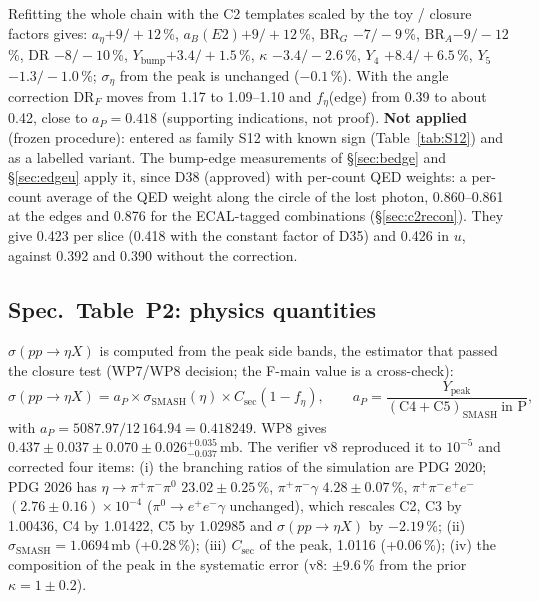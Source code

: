 \documentclass[11pt,a4paper]{article}
\newcommand{\piz}{\ensuremath{\pi^{0}}\xspace}
\newcommand{\ee}{\ensuremath{e^{+}e^{-}}\xspace}
\newcommand{\pipi}{\ensuremath{\pi^{+}\pi^{-}}\xspace}
\newcommand{\ppee}{\ensuremath{\pi^{+}\pi^{-}e^{+}e^{-}}\xspace}
\newcommand{\aEta}{\ensuremath{a_\eta}\xspace}
\newcommand{\aP}{\ensuremath{a_P}\xspace}
\newcommand{\aB}{\ensuremath{a_B(E2)}\xspace}%
\newcommand{\Ybump}{\ensuremath{Y_{\mathrm{bump}}}\xspace}
\newcommand{\Csec}{\ensuremath{C_{\mathrm{sec}}}\xspace}
\newcommand{\BRG}{\ensuremath{\mathrm{BR}_G}\xspace}
\newcommand{\BRA}{\ensuremath{\mathrm{BR}_A}\xspace}
\newcommand{\sigeta}{\ensuremath{\sigma(pp\to\eta X)}\xspace}
\newcommand{\tabin}[1]{}
\begin{document}
Refitting the whole chain with the C2 templates scaled by the toy / closure factors gives: \aEta $+9/+12$\,\%, \aB $+9/+12$\,\%, \BRG
$-7/-9$\,\%, \BRA $-9/-12$\,\%, DR $-8/-10$\,\%, \Ybump $+3.4/+1.5$\,\%, $\kappa$ $-3.4/-2.6$\,\%, $Y_4$ $+8.4/+6.5$\,\%, $Y_5$ $-1.3/-1.0$\,\%;
$\sigma_\eta$ from the peak is unchanged ($-0.1$\,\%). With the angle correction DR$_F$ moves from 1.17 to 1.09--1.10 and $f_\eta$(edge) from 0.39
to about 0.42, close to \aP $=0.418$ (supporting indications, not proof). \textbf{Not applied} (frozen procedure): entered as family S12 with
known sign (Table~\ref{tab:S12}) and as a labelled variant. The bump-edge measurements of \S\ref{sec:bedge} and \S\ref{sec:edgeu} apply it, since D38 (approved) with
per-count QED weights: a per-count average of the QED weight along the circle of the lost photon, 0.860--0.861 at the edges and 0.876 for the
ECAL-tagged combinations (\S\ref{sec:c2recon}). They give 0.423 per slice (0.418 with the constant factor of D35) and 0.426 in $u$, against
0.392 and 0.390 without the correction.

\tabin{wp8_eps2.tex}

\subsection{Spec.\ Table~P2: physics quantities}
\label{sec:p2}
\textbf{\sigeta} is computed from the peak side bands, the estimator that passed the closure test (WP7/WP8 decision; the F-main value is a
cross-check):
\begin{equation}
\sigma(pp\to\eta X)=a_P\times\sigma_{\mathrm{SMASH}}(\eta)\times C_{\mathrm{sec}}(1-f_\eta),\qquad
a_P=\frac{Y_{\mathrm{peak}}}{(\mathrm{C4}+\mathrm{C5})_{\mathrm{SMASH}}\ \text{in P}},
\label{eq:sigma}
\end{equation}
with $\aP=5087.97/12\,164.94=0.418249$.
WP8 gives $0.437\pm0.037\pm0.070\pm0.026^{+0.035}_{-0.037}$\,mb. The verifier v8 reproduced it to $10^{-5}$ and corrected four items:
(i) the branching ratios of the simulation are PDG 2020; PDG 2026 has $\eta\to\pipi\piz$ $23.02\pm0.25$\,\%, $\pipi\gamma$ $4.28\pm0.07$\,\%,
$\ppee$ $(2.76\pm0.16)\times10^{-4}$ ($\piz\to\ee\gamma$ unchanged), which rescales C2, C3 by 1.00436, C4 by 1.01422, C5 by 1.02985 and \sigeta by
$-2.19$\,\%; (ii) $\sigma_{\mathrm{SMASH}}=1.0694$\,mb (+0.28\,\%); (iii) \Csec of the peak, 1.0116 (+0.06\,\%); (iv) the composition of the
peak in the systematic error (v8: $\pm9.6$\,\% from the prior $\kappa=1\pm0.2$).
\end{document}
